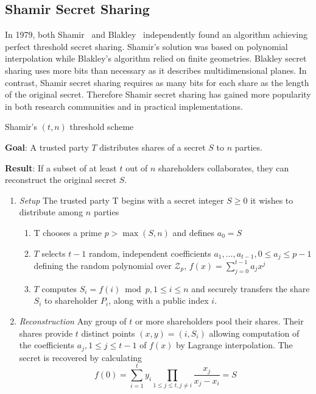 \subsection{Shamir Secret Sharing}
In 1979, both Shamir~\cite{art:Shamir79} and Blakley~\cite{art:Blakley79} independently found an algorithm achieving perfect threshold secret sharing. Shamir's solution was based on polynomial interpolation while Blakley's algorithm relied on finite geometries. Blakley secret sharing uses more bits than necessary as it describes multidimensional planes. In contrast, Shamir secret sharing requires as many bits for each share as the length of the original secret. Therefore Shamir secret sharing has gained more popularity in both research communities and in practical implementations.

\begin{algorithm}
\caption{Shamir's $\left( t, n \right)$ threshold scheme~\cite{book:handbook_of_applied_cryptography} }
\label{alg:shamirs_threshold_sheme}
 \textbf{Goal}: A trusted party $T$ distributes shares of a secret $S$ to $n$ parties.
 
 \textbf{Result}: If a subset of at least $t$ out of $n$ shareholders collaborates, they can reconstruct the original secret $S$.
 \begin{enumerate}
  \item \textit{Setup} The trusted party T begins with a secret integer $S \geq 0$ it wishes to distribute among $n$ parties
   \begin{enumerate}
    \item T chooses a prime $p > \max \left( S, n \right)$ and defines $a_0 = S$
    \item $T$ selects $t-1$ random, independent coefficients $a_1, \ldots, a_{t-1}, 0 \leq a_j \leq p-1$ defining the random polynomial over $\mathcal{Z}_p$, $f \left( x \right) = \sum^{t-1}_{j=0} a_j x^j$
    \item $T$ computes $S_i = f \left( i \right) \bmod p, 1 \leq i \leq n$ and securely transfers the share $S_i$ to shareholder $P_i$, along with a public index $i$.
   \end{enumerate}
   \item \textit{Reconstruction} Any group of $t$ or more shareholders pool their shares. Their shares provide $t$ distinct points $\left( x, y \right) = \left( i, S_i \right)$ allowing computation of the coefficients $a_j, 1 \leq j \leq t-1$ of $f \left( x \right)$ by Lagrange interpolation. The secret is recovered by calculating
 \begin{equation*}
  f \left( 0 \right) = \sum^t_{i=1}y_i \prod_{1 \leq j \leq t, j \neq i} \frac{x_j}{x_j-x_i} = S
 \end{equation*}
 \end{enumerate}
\end{algorithm}

